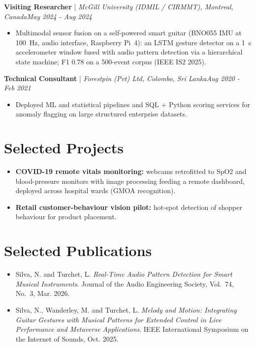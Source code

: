 \documentclass[11pt]{article}
\newenvironment{cvrole}[5]{%
  \par\noindent\textbf{\large #1} | \textit{\small #2, #3}\hfill \textit{\small #4 - #5}\par
  \begin{itemize}[leftmargin=2em, itemsep=-0.3em, topsep=-0.5em]%
}{%
  \end{itemize}\par\noindent\mbox{}\par\vspace{0.1em}%
}
\begin{document}
\begin{cvrole}{Visiting Researcher}{McGill University (IDMIL / CIRMMT)}{Montreal, Canada}{May 2024}{Aug 2024}
    \item Multimodal sensor fusion on a self-powered smart guitar (BNO055 IMU at 100~Hz, audio interface, Raspberry Pi~4): an LSTM gesture detector on a 1~s accelerometer window fused with audio pattern detection via a hierarchical state machine; F1 0.78 on a 500-event corpus (IEEE IS2 2025).
\end{cvrole}

\begin{cvrole}{Technical Consultant}{Forestpin (Pvt) Ltd}{Colombo, Sri Lanka}{Aug 2020}{Feb 2021}
    \item Deployed ML and statistical pipelines and SQL + Python scoring services for anomaly flagging on large structured enterprise datasets.
\end{cvrole}

\section*{Selected Projects \footnotesize {}}
\begin{itemize}[leftmargin=1.2em, itemsep=-0.25em]
    \item \textbf{COVID-19 remote vitals monitoring:} webcams retrofitted to SpO2 and blood-pressure monitors with image processing feeding a remote dashboard, deployed across hospital wards (GMOA recognition).
    \item \textbf{Retail customer-behaviour vision pilot:} hot-spot detection of shopper behaviour for product placement.
\end{itemize}

\section*{Selected Publications \footnotesize {}}
\begin{itemize}[leftmargin=1.2em, itemsep=-0.25em]
    \item Silva, N. and Turchet, L. \textit{Real-Time Audio Pattern Detection for Smart Musical Instruments}. Journal of the Audio Engineering Society, Vol.~74, No.~3, Mar. 2026.
    \item Silva, N., Wanderley, M. and Turchet, L. \textit{Melody and Motion: Integrating Guitar Gestures with Musical Patterns for Extended Control in Live Performance and Metaverse Applications}. IEEE International Symposium on the Internet of Sounds, Oct. 2025.
\end{itemize}
\end{document}
